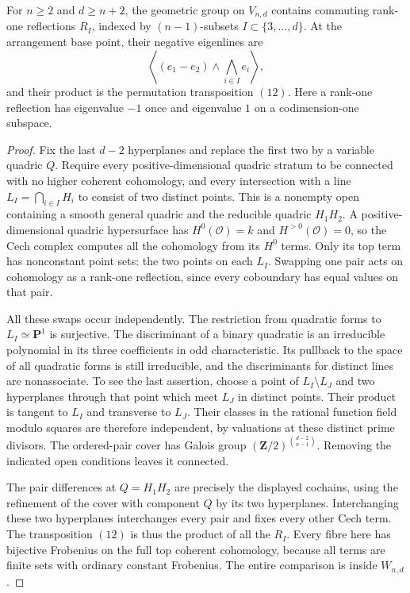 \begin{lemma}\label{lem:quadric-reflections}
For $n\geq2$ and $d\geq n+2$, the geometric group on
$V_{n,d}$ contains commuting rank-one reflections
$R_I$, indexed by $(n-1)$-subsets
$I\subset\{3,\ldots,d\}$.  At the arrangement base point,
their negative eigenlines are
\[
 \left\langle (e_1-e_2)\wedge\bigwedge_{i\in I}e_i\right\rangle,
\]
and their product is the permutation transposition $(12)$.
Here a rank-one reflection has eigenvalue $-1$ once and
eigenvalue $1$ on a codimension-one subspace.
\end{lemma}

\begin{proof}
Fix the last $d-2$ hyperplanes and replace the first two by a
variable quadric $Q$.  Require every positive-dimensional
quadric stratum to be connected with no higher coherent
cohomology, and every intersection with a line
$L_I=\bigcap_{i\in I}H_i$ to consist of two distinct points.
This is a nonempty open containing a smooth general quadric
and the reducible quadric $H_1H_2$.  A positive-dimensional
quadric hypersurface has $H^0(\mathcal O)=k$ and
$H^{>0}(\mathcal O)=0$, so the Cech complex computes all the
cohomology from its $H^0$ terms.  Only its top term has
nonconstant point sets: the two points on each $L_I$.
Swapping one pair acts on cohomology as a rank-one reflection,
since every coboundary has equal values on that pair.

All these swaps occur independently.  The restriction from
quadratic forms to $L_I\simeq\mathbf P^1$ is surjective.  The
discriminant of a binary quadratic is an irreducible polynomial
in its three coefficients in odd characteristic.  Its pullback
to the space of all quadratic forms is still irreducible, and
the discriminants for distinct lines are nonassociate.  To see
the last assertion, choose a point of $L_I\setminus L_J$ and
two hyperplanes through that point which meet $L_J$ in distinct
points.  Their product is tangent to $L_I$ and transverse to
$L_J$.  Their classes in the rational function field
modulo squares are therefore independent, by valuations at
these distinct prime divisors.  The ordered-pair cover has
Galois group $(\mathbf Z/2)^{\binom{d-2}{n-1}}$.
Removing the indicated open conditions leaves it connected.

The pair differences at $Q=H_1H_2$ are precisely the displayed
cochains, using the refinement of the cover with component $Q$
by its two hyperplanes.  Interchanging these two hyperplanes
interchanges every pair and fixes every other Cech term.
The transposition $(12)$ is thus the product of all the $R_I$.
Every fibre here has bijective Frobenius on the full top
coherent cohomology, because all terms are finite sets with
ordinary constant Frobenius.  The entire comparison is inside
$W_{n,d}$.
\end{proof}

